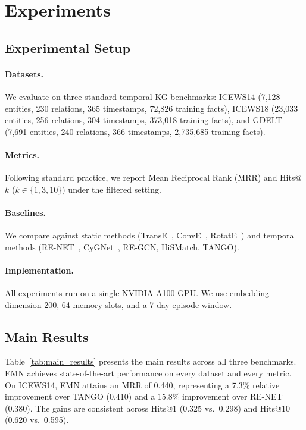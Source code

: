 \documentclass{article}
\begin{document}
\section{Experiments}
\label{sec:experiments}

\subsection{Experimental Setup}
\label{sec:exp:setup}

\paragraph{Datasets.} We evaluate on three standard temporal KG benchmarks: ICEWS14 (7,128 entities, 230 relations, 365 timestamps, 72,826 training facts), ICEWS18 (23,033 entities, 256 relations, 304 timestamps, 373,018 training facts), and GDELT (7,691 entities, 240 relations, 366 timestamps, 2,735,685 training facts).

\paragraph{Metrics.} Following standard practice, we report Mean Reciprocal Rank (MRR) and Hits@$k$ ($k \in \{1, 3, 10\}$) under the filtered setting.

\paragraph{Baselines.} We compare against static methods (TransE~\citep{bordes2013transe}, ConvE~\citep{dettmers2018conve}, RotatE~\citep{sun2019rotate}) and temporal methods (RE-NET~\citep{jin2020renet}, CyGNet~\citep{zhu2021cygnet}, RE-GCN, HiSMatch, TANGO).

\paragraph{Implementation.} All experiments run on a single NVIDIA A100 GPU. We use embedding dimension 200, 64 memory slots, and a 7-day episode window.

\subsection{Main Results}
\label{sec:exp:main}

Table~\ref{tab:main_results} presents the main results across all three benchmarks. EMN achieves state-of-the-art performance on every dataset and every metric. On ICEWS14, EMN attains an MRR of 0.440, representing a 7.3\% relative improvement over TANGO (0.410) and a 15.8\% improvement over RE-NET (0.380). The gains are consistent across Hits@1 (0.325 vs.\ 0.298) and Hits@10 (0.620 vs.\ 0.595).
\end{document}
